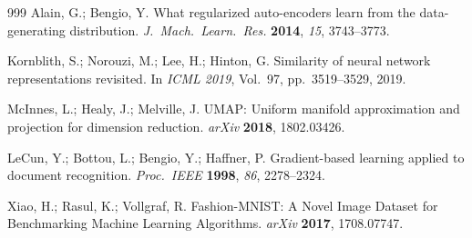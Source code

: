 \documentclass[make,article,submit,pdftex,moreauthors]{Definitions/mdpi}
\begin{document}
\begin{thebibliography}{999}
Alain, G.; Bengio, Y.
What regularized auto-encoders learn from the data-generating distribution.
\textit{J.\ Mach.\ Learn.\ Res.} \textbf{2014}, \textit{15}, 3743--3773.

Kornblith, S.; Norouzi, M.; Lee, H.; Hinton, G.
Similarity of neural network representations revisited.
In \textit{ICML 2019}, Vol.~97, pp.~3519--3529, 2019.

McInnes, L.; Healy, J.; Melville, J.
{UMAP}: Uniform manifold approximation and projection for dimension
reduction.
\textit{arXiv} \textbf{2018}, 1802.03426.

LeCun, Y.; Bottou, L.; Bengio, Y.; Haffner, P.
Gradient-based learning applied to document recognition.
\textit{Proc.\ IEEE} \textbf{1998}, \textit{86}, 2278--2324.

Xiao, H.; Rasul, K.; Vollgraf, R.
Fashion-{MNIST}: A Novel Image Dataset for Benchmarking Machine Learning
Algorithms.
\textit{arXiv} \textbf{2017}, 1708.07747.

\end{thebibliography}
\end{document}
